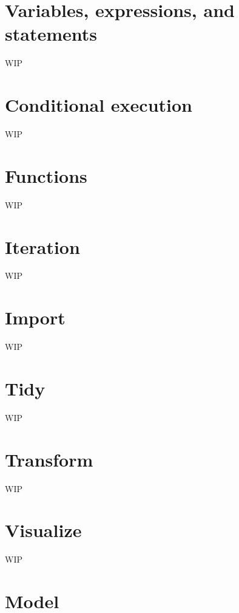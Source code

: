 \documentclass[]{book}
\begin{document}
\hypertarget{variables-expressions-and-statements}{%
\chapter{Variables, expressions, and statements}\label{variables-expressions-and-statements}}

WIP

\hypertarget{conditional-execution}{%
\chapter{Conditional execution}\label{conditional-execution}}

WIP

\hypertarget{functions}{%
\chapter{Functions}\label{functions}}

WIP

\hypertarget{iteration}{%
\chapter{Iteration}\label{iteration}}

WIP

\hypertarget{import}{%
\chapter{Import}\label{import}}

WIP

\hypertarget{tidy}{%
\chapter{Tidy}\label{tidy}}

WIP

\hypertarget{transform}{%
\chapter{Transform}\label{transform}}

WIP

\hypertarget{visualize}{%
\chapter{Visualize}\label{visualize}}

WIP

\hypertarget{model}{%
\chapter{Model}\label{model}}
\end{document}
